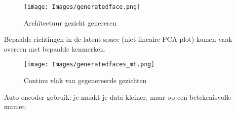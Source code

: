 {\begin{figure}[h]
    \centering
    \texttt{[image: Images/generatedface.png]}
    \caption{Architectuur gezicht genereren}
    \label{fig:generatedfaces}
\end{figure}

\noindent Bepaalde richtingen in de latent space (niet-lineaire PCA plot) komen vaak overeen met bepaalde kenmerken.

\begin{figure}[h]
    \centering
    \texttt{[image: Images/generatedfaces\_mt.png]}
    \caption{Continu vlak van gegenereerde gezichten}
    \label{fig:generatedfaces}
\end{figure}

\noindent Auto-encoder gebruik: je maakt je data kleiner, maar op een betekenisvolle manier.



}

